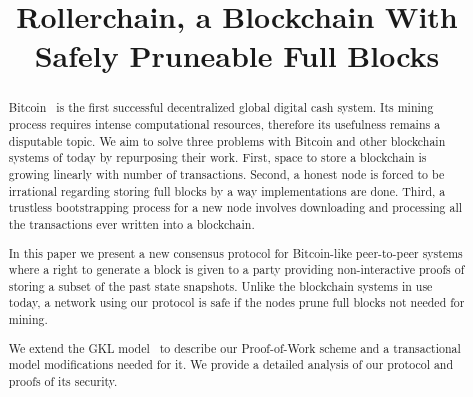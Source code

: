 \documentclass[conference,compsoc]{IEEEtran}
\begin{document}
\title{Rollerchain, a Blockchain With Safely Pruneable Full Blocks}

\author{
\and
{}
\and
{}
}

\maketitle

\onecolumn

\begin{abstract}

Bitcoin~\cite{Nakamoto2008} is the first successful decentralized global digital cash system. Its mining process requires intense computational resources, therefore its usefulness remains a disputable topic. We aim to solve three problems with Bitcoin and other blockchain systems of today by repurposing their work. First, space to store a blockchain is growing linearly with number of transactions. Second, a honest node is forced to be irrational regarding storing full blocks by a way implementations are done. Third, 
a trustless bootstrapping process for a new node involves downloading and processing all the transactions ever written into a blockchain.  

In this paper we present a new consensus protocol for Bitcoin-like peer-to-peer systems where a right to generate a block is given to a party providing non-interactive proofs of storing a subset of the past state snapshots. Unlike the blockchain systems in use today, a network using our protocol is safe if the nodes prune full blocks not needed for mining. 

We extend the GKL model~\cite{garay2015bitcoin} to describe our Proof-of-Work scheme and a transactional model modifications needed for it. We provide a detailed analysis of our protocol and proofs of its security.

\end{abstract}
\end{document}
